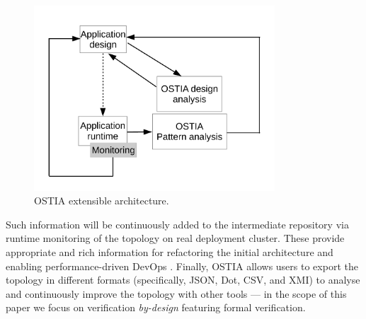 \documentclass[smallextended]{svjour3}       %
\begin{document}
\begin{figure}[H]
	\begin{center}
		\includegraphics[width=9cm,draft]{fig1}
		\caption{OSTIA extensible architecture.}\label{archostia}
	\end{center}
\end{figure}

Such information will be continuously added to the intermediate repository via
runtime monitoring of the topology on real deployment cluster. These provide
appropriate and rich information for refactoring the initial architecture and
enabling performance-driven DevOps \cite{brunnert2015performance}.
Finally, OSTIA allows users to export the topology in different formats
(specifically, JSON, Dot, CSV, and XMI) to analyse and continuously improve the topology with other tools --- in the scope of this paper we focus on verification \emph{by-design} featuring formal verification.
\end{document}
